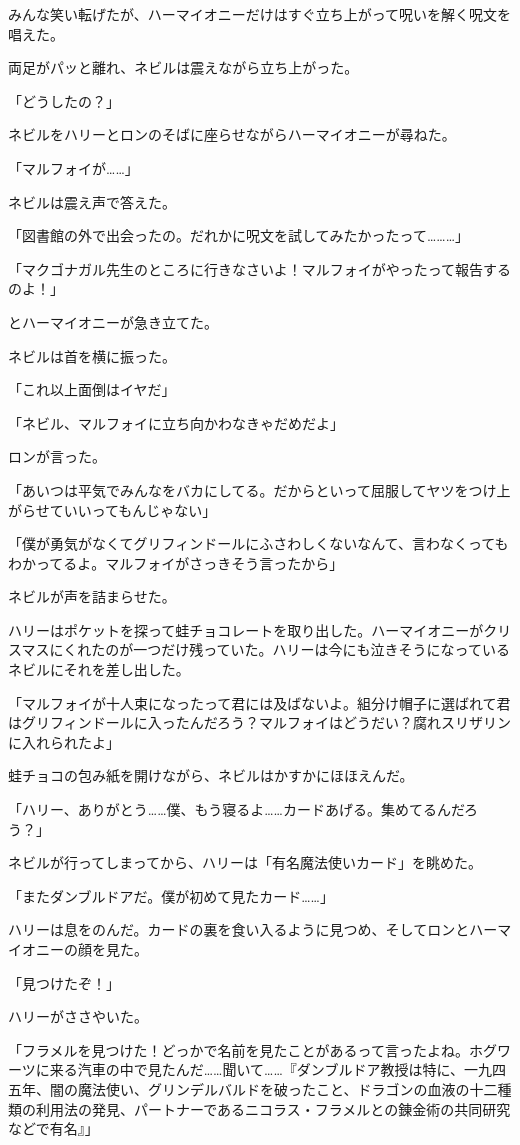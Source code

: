 \documentclass[10pt,a4paper]{article}
\begin{document}
\begin{CJK}{UTF8}{min}
みんな笑い転げたが、ハーマイオニーだけはすぐ立ち上がって呪いを解く呪文を唱えた。

両足がパッと離れ、ネビルは震えながら立ち上がった。

「どうしたの？」

ネビルをハリーとロンのそばに座らせながらハーマイオニーが尋ねた。

「マルフォイが……」

ネビルは震え声で答えた。

「図書館の外で出会ったの。だれかに呪文を試してみたかったって………」

「マクゴナガル先生のところに行きなさいよ！マルフォイがやったって報告するのよ！」

とハーマイオニーが急き立てた。

ネビルは首を横に振った。

「これ以上面倒はイヤだ」

「ネビル、マルフォイに立ち向かわなきゃだめだよ」

ロンが言った。

「あいつは平気でみんなをバカにしてる。だからといって屈服してヤツをつけ上がらせていいってもんじゃない」

「僕が勇気がなくてグリフィンドールにふさわしくないなんて、言わなくってもわかってるよ。マルフォイがさっきそう言ったから」

ネビルが声を詰まらせた。

ハリーはポケットを探って蛙チョコレートを取り出した。ハーマイオニーがクリスマスにくれたのが一つだけ残っていた。ハリーは今にも泣きそうになっているネビルにそれを差し出した。

「マルフォイが十人束になったって君には及ばないよ。組分け帽子に選ばれて君はグリフィンドールに入ったんだろう？マルフォイはどうだい？腐れスリザリンに入れられたよ」

蛙チョコの包み紙を開けながら、ネビルはかすかにほほえんだ。

「ハリー、ありがとう……僕、もう寝るよ……カードあげる。集めてるんだろう？」

ネビルが行ってしまってから、ハリーは「有名魔法使いカード」を眺めた。

「またダンブルドアだ。僕が初めて見たカード……」

ハリーは息をのんだ。カードの裏を食い入るように見つめ、そしてロンとハーマイオニーの顔を見た。

「見つけたぞ！」

ハリーがささやいた。

「フラメルを見つけた！どっかで名前を見たことがあるって言ったよね。ホグワーツに来る汽車の中で見たんだ……聞いて……『ダンブルドア教授は特に、一九四五年、闇の魔法使い、グリンデルバルドを破ったこと、ドラゴンの血液の十二種類の利用法の発見、パートナーであるニコラス・フラメルとの錬金術の共同研究などで有名』」


\end{CJK}
\end{document}

